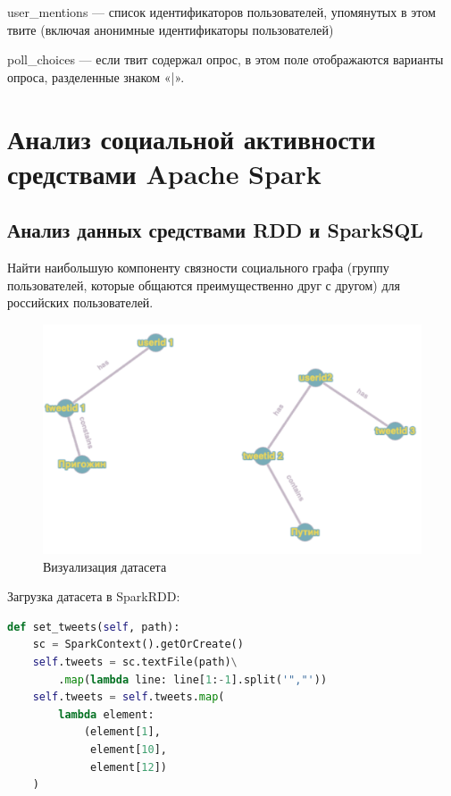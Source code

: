user\_mentions — список идентификаторов пользователей, упомянутых в этом твите (включая анонимные идентификаторы пользователей)

poll\_choices — если твит содержал опрос, в этом поле отображаются варианты опроса, разделенные знаком «|».



\section{Анализ социальной активности средствами Apache Spark}

\subsection{Анализ данных средствами RDD и SparkSQL}

Найти наибольшую компоненту связности социального графа (группу пользователей, которые общаются преимущественно друг с другом) для российских пользователей.

\begin{figure}[htb]
	\centering
	\includegraphics[width=.9\textwidth]{rddgraph.png}
	\parskip=6pt
	\caption{Визуализация датасета}
	\label{fig:gfpic}
\end{figure}

Загрузка датасета в SparkRDD:

\begin{lstlisting}[language={Python}, caption={Нахождение наибольшей компоненты связанности}, label=lst:rdd1]
def set_tweets(self, path):
	sc = SparkContext().getOrCreate()
	self.tweets = sc.textFile(path)\
		.map(lambda line: line[1:-1].split('","'))
	self.tweets = self.tweets.map(
		lambda element: 
			(element[1], 
			 element[10], 
			 element[12])
	)
\end{lstlisting}

